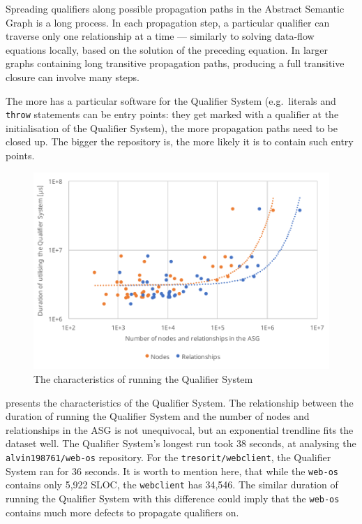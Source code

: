 Spreading qualifiers along possible propagation paths in the Abstract Semantic Graph is a long process. In each propagation step, a particular qualifier can traverse only one relationship at a time — similarly to solving data-flow equations locally, based on the solution of the preceding equation. In larger graphs containing long transitive propagation paths, producing a full transitive closure can involve many steps.

The more  has a particular software for the Qualifier System (e.g.\ literals and \lstinline{throw} statements can be entry points: they get marked with a qualifier at the initialisation of the Qualifier System), the more propagation paths need to be closed up. The bigger the repository is, the more likely it is to contain such entry points.

\begin{figure}[!htb]
	\centerfloat
	\includegraphics[width=\textwidth,clip]{figures/measurement-qualifiersystem-nodes-relationships.pdf}
	\caption{The characteristics of running the Qualifier System}
	\label{fig:measurement-qualifiersystem-nodes-relationships}
\end{figure}

 presents the characteristics of the Qualifier System. The relationship between the duration of running the Qualifier System and the number of nodes and relationships in the ASG is not unequivocal, but an exponential trendline fits the dataset well. The Qualifier System's longest run took 38 seconds, at analysing the \lstinline{alvin198761/web-os} repository. For the \lstinline{tresorit/webclient}, the Qualifier System ran for 36 seconds. It is worth to mention here, that while the \lstinline{web-os} contains only 5,922 SLOC, the \lstinline{webclient} has 34,546. The similar duration of running the Qualifier System with this difference could imply that the \lstinline{web-os} contains much more defects to propagate qualifiers on.


